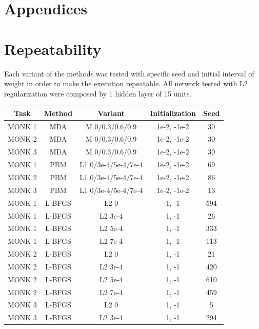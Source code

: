 \appendix
{}
\section*{Appendices}
\section{Repeatability}
Each variant of the methods was tested with specific seed and initial interval of weight in order to make the execution repeatable.
All network tested with L2 regularization were composed by 1 hidden layer of 15 units.
\begin{table}[H]
	\centering
	\begin{tabular}{|c|c|c|c|c|}
		\hline
		\textbf{Task} &	\textbf{Method} &\textbf{ Variant} & \textbf{Initialization} &\textbf{Seed} \\ \hline
		MONK 1        &    MDA & M  0/0.3/0.6/0.9 & 1e-2, -1e-2 & 30  \\ \hline
		MONK 2        &    MDA & M  0/0.3/0.6/0.9 & 1e-2, -1e-2 & 30  \\ \hline
		MONK 3        &    MDA & M  0/0.3/0.6/0.9 & 1e-2, -1e-2 & 30  \\ \hline			
		MONK 1        &    PBM & L1  0/3e-4/5e-4/7e-4 & 1e-2, -1e-2 & 69  \\ \hline
		MONK 2        &    PBM & L1  0/3e-4/5e-4/7e-4 & 1e-2, -1e-2 & 86  \\ \hline
		MONK 3        &    PBM & L1  0/3e-4/5e-4/7e-4 & 1e-2, -1e-2 & 13  \\ \hline			
		MONK 1        &    L-BFGS & L2  0 & 1, -1 & 594  \\ \hline
		MONK 1        &    L-BFGS & L2  3e-4 & 1, -1 & 26  \\ \hline
		MONK 1        &    L-BFGS & L2  5e-4 & 1, -1 & 333  \\ \hline
		MONK 1        &    L-BFGS & L2  7e-4 & 1, -1 & 113  \\ \hline
		MONK 2        &    L-BFGS & L2  0 & 1, -1 & 21  \\ \hline
		MONK 2        &    L-BFGS & L2  3e-4 & 1, -1 & 420  \\ \hline
		MONK 2        &    L-BFGS & L2  5e-4 & 1, -1 & 610  \\ \hline
		MONK 2        &    L-BFGS & L2  7e-4 & 1, -1 & 459  \\ \hline
		MONK 3        &    L-BFGS & L2  0 & 1, -1 & 5  \\ \hline
		MONK 3        &    L-BFGS & L2  3e-4 & 1, -1 & 294  \\ \hline

\end{tabular}
\end{table}
